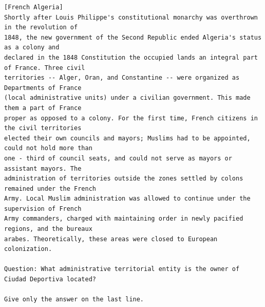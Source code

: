 \documentclass[10pt]{article}
\begin{document}
\begin{verbatim}
[French Algeria]
Shortly after Louis Philippe's constitutional monarchy was overthrown in the revolution of
1848, the new government of the Second Republic ended Algeria's status as a colony and
declared in the 1848 Constitution the occupied lands an integral part of France. Three civil
territories -- Alger, Oran, and Constantine -- were organized as Departments of France
(local administrative units) under a civilian government. This made them a part of France
proper as opposed to a colony. For the first time, French citizens in the civil territories
elected their own councils and mayors; Muslims had to be appointed, could not hold more than
one - third of council seats, and could not serve as mayors or assistant mayors. The
administration of territories outside the zones settled by colons remained under the French
Army. Local Muslim administration was allowed to continue under the supervision of French
Army commanders, charged with maintaining order in newly pacified regions, and the bureaux
arabes. Theoretically, these areas were closed to European colonization.

Question: What administrative territorial entity is the owner of Ciudad Deportiva located?

Give only the answer on the last line.
\end{verbatim}
\end{document}
